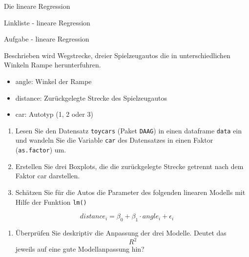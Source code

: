 \documentclass[ignorenonframetext,]{beamer}
\providecommand{\tightlist}{%
\setlength{\itemsep}{0pt}\setlength{\parskip}{0pt}}
\begin{document}
\begin{frame}[fragile]{Die lineare Regression}
\begin{block}{Linkliste - lineare Regression}
\end{block}

\begin{block}{Aufgabe - lineare Regression}

Beschrieben wird Wegstrecke, dreier Spielzeugautos die in
unterschiedlichen Winkeln Rampe herunterfuhren.

\begin{itemize}
\tightlist
\item
  angle: Winkel der Rampe
\item
  distance: Zurückgelegte Strecke des Spielzeugautos
\item
  car: Autotyp (1, 2 oder 3)
\end{itemize}

\begin{enumerate}
\def\labelenumi{(\alph{enumi})}
\item
  Lesen Sie den Datensatz \texttt{toycars} (Paket \texttt{DAAG}) in
  einen dataframe \texttt{data} ein und wandeln Sie die Variable
  \texttt{car} des Datensatzes in einen Faktor (\texttt{as.factor}) um.
\item
  Erstellen Sie drei Boxplots, die die zurückgelegte Strecke getrennt
  nach dem Faktor car darstellen.
\item
  Schätzen Sie für die Autos die Parameter des folgenden linearen
  Modells mit Hilfe der Funktion \texttt{lm()}
\end{enumerate}

\[ distance_i= \beta_0 + \beta_1 \cdot angle_i + \epsilon_i\]

\begin{enumerate}
\def\labelenumi{(\alph{enumi})}
\setcounter{enumi}{3}
\tightlist
\item
  Überprüfen Sie deskriptiv die Anpassung der drei Modelle. Deutet das
  \[ R^2 \] jeweils auf eine gute Modellanpassung hin?
\end{enumerate}

\end{block}

\end{frame}
\end{document}
